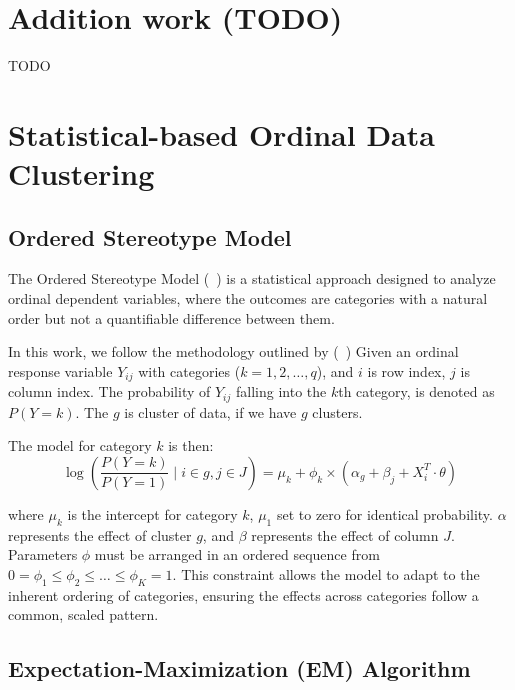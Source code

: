 \documentclass{article}
\begin{document}

\section{Addition work (TODO)}

TODO

\section{Statistical-based Ordinal Data Clustering}

\subsection{Ordered Stereotype Model}

The Ordered Stereotype Model  (~\cite{anderson1984regression}) is a statistical approach designed to analyze ordinal dependent variables, 
where the outcomes are categories with a natural order but not a quantifiable difference between them.

In this work, we follow the methodology outlined by (~\cite{fernandez2016mixture})
Given an ordinal response variable $Y_{ij}$ with categories ($k=1, 2, \ldots, q$), and $i$ is row index, $j$ is column index.
The probability of $Y_{ij}$ falling into the $k$th category, is denoted as $P(Y = k)$.
The $g$ is cluster of data, if we have $g$ clusters.

The model for category $k$ is then:
\begin{equation}
  \log\left(\frac{P(Y = k)}{P(Y = 1)} \mid i \in g, j \in J\right) = \mu_k + \phi_k \times \left(\alpha_g + \beta_j + X_i^T \cdot \theta \right)
\end{equation}
  

where $\mu_k$ is the intercept for category $k$, $\mu_1$ set to zero for identical probability. 
 $\alpha$ represents the effect of cluster $g$,
and $\beta$ represents the effect of column $J$.
Parameters $\phi$ must be arranged in an ordered sequence from 
$0 = \phi_1 \leq \phi_2 \leq \ldots \leq \phi_K = 1.$ 
This constraint allows the model to adapt to the inherent ordering of categories, ensuring the effects across categories follow a common, scaled pattern.


  


\subsection{Expectation-Maximization (EM) Algorithm}
\end{document}
